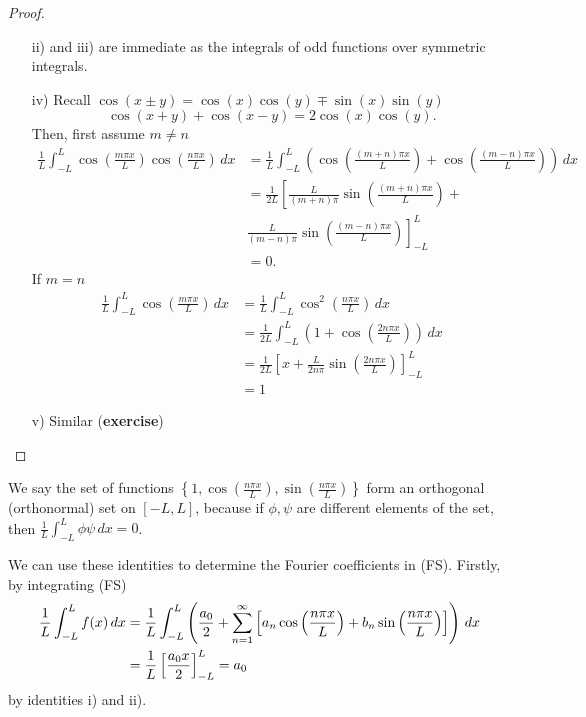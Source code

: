\documentclass[10pt, a4paper]{article}
\begin{document}
\begin{lemma}
\begin{proof}
\begin{enumerate}[label = \roman*)]
\[            \]
            ii) and iii) are immediate as the integrals of odd functions over symmetric integrals.
            \item[iv)]
            Recall $\cos(x \pm y) = \cos(x)\cos(y) \mp \sin(x)\sin(y)$
            \[
            \cos(x + y) + \cos(x - y) = 2\cos(x)\cos(y).
            \]
            Then,
            first assume $m \neq n$
            \begin{align*}
                \frac{1}{L}\int_{-L}^{L}\cos\left(\frac{m\pi x}{L}\right)\cos\left(\frac{n\pi x}{L}\right)\,dx &= \frac{1}{L}\int_{-L}^{L}\left(\cos\left(\frac{(m + n)\pi x}{L}\right) + \cos\left(\frac{(m - n)\pi x}{L}\right)\right)\,dx \\
                &= \frac{1}{2L}\left[\frac{L}{(m + n)\pi}\sin\left(\frac{(m + n)\pi x}{L}\right) + \right. \\
                &\left.\frac{L}{(m - n)\pi}\sin\left(\frac{(m - n)\pi x}{L}\right)\right]_{-L}^{L} \\
                &= 0.
            \end{align*}
            If $m = n$
            \begin{align*}
                \frac{1}{L}\int_{-L}^{L}\cos\left(\frac{m\pi x}{L}\right)\,dx &= \frac{1}{L}\int_{-L}^{L}\cos ^ 2\left(\frac{n\pi x}{L}\right)\,dx \\
                &= \frac{1}{2L}\int_{-L}^{L}\left(1 + \cos\left(\frac{2n\pi x}{L}\right)\right)\,dx \\
                &= \frac{1}{2L}\left[x + \frac{L}{2n\pi}\sin\left(\frac{2n\pi x}{L}\right)\right]_{-L}^{L} \\
                &= 1
            \end{align*}
            \item [v)] Similar
            (\textbf{exercise})
        \end{enumerate}
    \end{proof}
\end{lemma}

We say the set of functions $\left\{1, \cos\left(\frac{n\pi x}{L}\right), \sin\left(\frac{n\pi x}{L}\right)\right\}$ form an orthogonal
(orthonormal)
set on $[-L, L]$,
because if $\phi, \psi$ are different elements of the set,
then $\frac{1}{L}\int_{-L}^{L}\phi\psi\,dx = 0$.

We can use these identities to determine the Fourier coefficients in (FS).
Firstly,
by integrating (FS)
\begin{align*}
    \frac{1}{L}\int_{-L}^{L}f(x)\,dx &= \frac{1}{L}\int_{-L}^{L}\left(\frac{a_0}{2} + \infsum[n = 1]\left[a_n\cos\left(\frac{n\pi x}{L}\right) + b_n\sin\left(\frac{n\pi x}{L}\right)\right]\right)\,dx \\
    &= \frac{1}{L}\left[\frac{a_0x}{2}\right]_{-L}^{L} = a_0
\end{align*}
by identities i) and ii).
\end{document}
